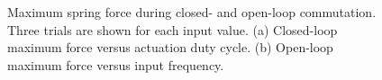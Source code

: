 \documentclass[journal]{IEEEtran}
\begin{document}
\begin{figure}[]
\begin{center}
\end{center}
\caption{\label{fig:max-force-both}
Maximum spring force during closed- and open-loop commutation. Three trials are shown for each input value.
(a) Closed-loop maximum force versus actuation duty cycle. 
(b) Open-loop maximum force versus input frequency.}
\vspace{-5pt}
\end{figure}
\end{document}
